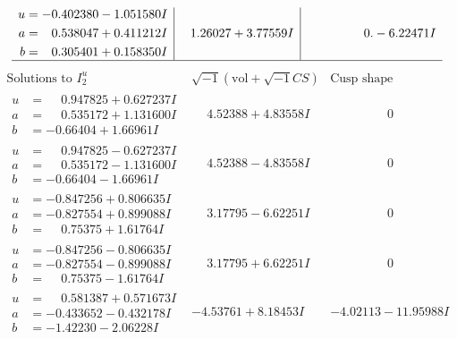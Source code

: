 \documentclass[1p]{elsarticle_modified}
\theoremstyle{definition}
\newcommand{\I}{\sqrt{-1}}
\begin{document}
$$\begin{array}{c|c|c}
\begin{aligned}
u &= -0.402380 - 1.051580 I \\
a &= \phantom{-}0.538047 + 0.411212 I \\
b &= \phantom{-}0.305401 + 0.158350 I\end{aligned}
 & \phantom{-}1.26027 + 3.77559 I & \phantom{-0.000000 } 0. - 6.22471 I\\
 \hline 
 \end{array}$$\newpage$$\begin{array}{c|c|c}  
\text{Solutions to }I^u_{2}& \I (\text{vol} + \sqrt{-1}CS) & \text{Cusp shape}\\
 \hline 
\begin{aligned}
u &= \phantom{-}0.947825 + 0.627237 I \\
a &= \phantom{-}0.535172 + 1.131600 I \\
b &= -0.66404 + 1.66961 I\end{aligned}
 & \phantom{-}4.52388 + 4.83558 I & \phantom{-0.000000 } 0 \\ \hline\begin{aligned}
u &= \phantom{-}0.947825 - 0.627237 I \\
a &= \phantom{-}0.535172 - 1.131600 I \\
b &= -0.66404 - 1.66961 I\end{aligned}
 & \phantom{-}4.52388 - 4.83558 I & \phantom{-0.000000 } 0 \\ \hline\begin{aligned}
u &= -0.847256 + 0.806635 I \\
a &= -0.827554 + 0.899088 I \\
b &= \phantom{-}0.75375 + 1.61764 I\end{aligned}
 & \phantom{-}3.17795 - 6.62251 I & \phantom{-0.000000 } 0 \\ \hline\begin{aligned}
u &= -0.847256 - 0.806635 I \\
a &= -0.827554 - 0.899088 I \\
b &= \phantom{-}0.75375 - 1.61764 I\end{aligned}
 & \phantom{-}3.17795 + 6.62251 I & \phantom{-0.000000 } 0 \\ \hline\begin{aligned}
u &= \phantom{-}0.581387 + 0.571673 I \\
a &= -0.433652 - 0.432178 I \\
b &= -1.42230 - 2.06228 I\end{aligned}
 & -4.53761 + 8.18453 I & -4.02113 - 11.95988 I \\ \hline\begin{aligned}

\end{aligned}
\end{array}$$
\end{document}

